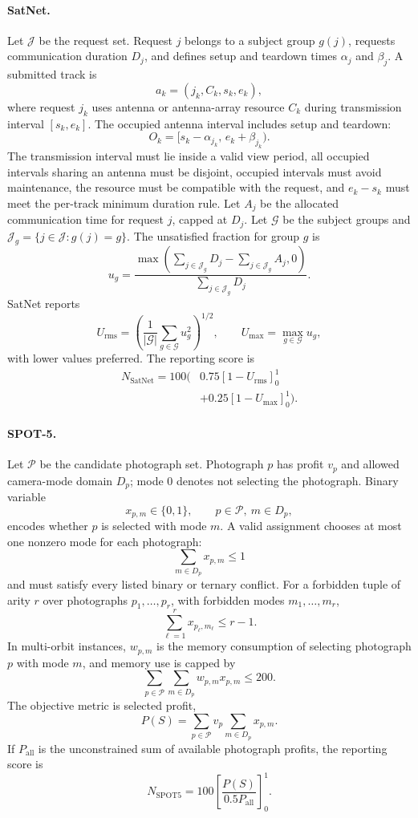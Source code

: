 \documentclass[11pt]{article}
\begin{document}
\paragraph{SatNet.} Let \(\mathcal{J}\) be the request set. Request \(j\) belongs to a subject group \(g(j)\), requests communication duration \(D_j\), and defines setup and teardown times \(\alpha_j\) and \(\beta_j\). A submitted track is
\[
  a_k=(j_k,C_k,s_k,e_k),
\]
where request \(j_k\) uses antenna or antenna-array resource \(C_k\) during transmission interval \([s_k,e_k]\). The occupied antenna interval includes setup and teardown:
\[
  O_k=[s_k-\alpha_{j_k},\,e_k+\beta_{j_k}).
\]
The transmission interval must lie inside a valid view period, all occupied intervals sharing an antenna must be disjoint, occupied intervals must avoid maintenance, the resource must be compatible with the request, and \(e_k-s_k\) must meet the per-track minimum duration rule. Let \(A_j\) be the allocated communication time for request \(j\), capped at \(D_j\). Let \(\mathcal{G}\) be the subject groups and \(\mathcal{J}_g=\{j\in\mathcal{J}:g(j)=g\}\). The unsatisfied fraction for group \(g\) is
\[
  u_g=\frac{\max\left(\sum_{j\in\mathcal{J}_g}D_j-\sum_{j\in\mathcal{J}_g}A_j,0\right)}{\sum_{j\in\mathcal{J}_g}D_j}.
\]
SatNet reports
\[
  U_{\mathrm{rms}}=\left(\frac{1}{|\mathcal{G}|}\sum_{g\in\mathcal{G}}u_g^2\right)^{1/2},\qquad
  U_{\max}=\max_{g\in\mathcal{G}}u_g,
\]
with lower values preferred. The reporting score is
\[
  \begin{aligned}
  N_{\mathrm{SatNet}}=100(&0.75[1-U_{\mathrm{rms}}]_0^1\\
  &+0.25[1-U_{\max}]_0^1).
  \end{aligned}
\]

\paragraph{SPOT-5.} Let \(\mathcal{P}\) be the candidate photograph set. Photograph \(p\) has profit \(v_p\) and allowed camera-mode domain \(D_p\); mode \(0\) denotes not selecting the photograph. Binary variable
\[
  x_{p,m}\in\{0,1\},\qquad p\in\mathcal{P},\ m\in D_p,
\]
encodes whether \(p\) is selected with mode \(m\). A valid assignment chooses at most one nonzero mode for each photograph:
\[
  \sum_{m\in D_p}x_{p,m}\le 1
\]
and must satisfy every listed binary or ternary conflict. For a forbidden tuple of arity \(r\) over photographs \(p_1,\ldots,p_r\), with forbidden modes \(m_1,\ldots,m_r\),
\[
  \sum_{\ell=1}^{r}x_{p_\ell,m_\ell}\le r-1.
\]
In multi-orbit instances, \(w_{p,m}\) is the memory consumption of selecting photograph \(p\) with mode \(m\), and memory use is capped by
\[
  \sum_{p\in\mathcal{P}}\sum_{m\in D_p} w_{p,m}x_{p,m}\le 200.
\]
The objective metric is selected profit,
\[
  P(S)=\sum_{p\in\mathcal{P}}v_p\sum_{m\in D_p}x_{p,m}.
\]
If \(P_{\mathrm{all}}\) is the unconstrained sum of available photograph profits, the reporting score is
\[
  N_{\mathrm{SPOT5}}=100\left[\frac{P(S)}{0.5P_{\mathrm{all}}}\right]_0^1.
\]
\end{document}
